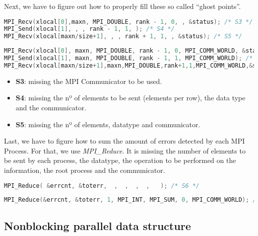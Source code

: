 \documentclass[a4paper, 10pt]{article}
\begin{document}
    Next, we have to figure out how to properly fill these so called ``ghost points''. 


    \begin{lstlisting}[language=c, caption={Template S3, S4, S5}]
MPI_Recv(xlocal[0],maxn, MPI_DOUBLE, rank - 1, 0, , &status); /* S3 */
MPI_Send(xlocal[1], , , rank - 1, 1, ); /* S4 */
MPI_Recv(xlocal[maxn/size+1], , , rank + 1, 1, , &status); /* S5 */
    \end{lstlisting}

    \begin{lstlisting}[language=c, caption={Correct S3, S4, S5}]
MPI_Recv(xlocal[0], maxn, MPI_DOUBLE, rank - 1, 0, MPI_COMM_WORLD, &status); /* S3 */
MPI_Send(xlocal[1], maxn, MPI_DOUBLE, rank - 1, 1, MPI_COMM_WORLD); /* S4 */
MPI_Recv(xlocal[maxn/size+1],maxn,MPI_DOUBLE,rank+1,1,MPI_COMM_WORLD,&status); /* S5 */
    \end{lstlisting}
    \begin{itemize}
	\item \textbf{S3}: missing the MPI Communicator to be used.
	\item \textbf{S4}: missing the nº of elements to be sent (elements per row), the data type and 
	    the communicator.
	\item \textbf{S5}: missing the nº of elements, datatype and communicator.
    \end{itemize}

    Last, we have to figure how to sum the amount of errors detected by each MPI Process. For that, we use \textit{MPI\_Reduce}. It is missing the number of elements to be sent by each process, the datatype, the operation to be performed on the information, the root process and the communicator.

    \begin{lstlisting}[language=c, caption={Template S6}]
MPI_Reduce( &errcnt, &toterr,  ,  ,  ,  ,   ); /* S6 */
    \end{lstlisting}

    \begin{lstlisting}[language=c, caption={Correct S6}]
MPI_Reduce(&errcnt, &toterr, 1, MPI_INT, MPI_SUM, 0, MPI_COMM_WORLD); /* S6 */
    \end{lstlisting}



\subsection{Nonblocking parallel data structure}
\end{document}
